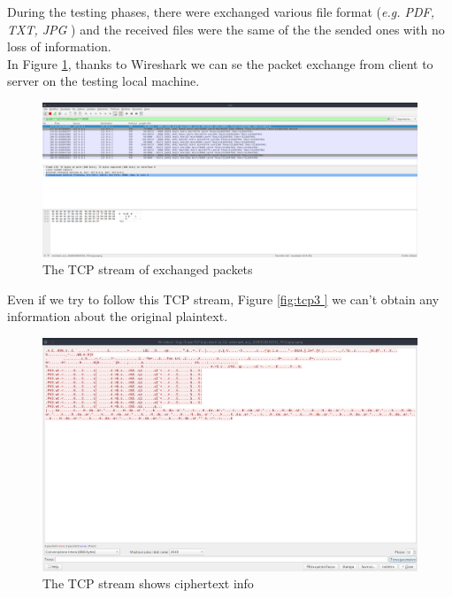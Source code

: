 \documentclass[]{report}
\begin{document}
During the testing phases, there were exchanged various file format (\textit{e.g. PDF, TXT, JPG }) and the received files were the same of the the sended ones with no loss of information.\\
In Figure \ref{fig:tcp2}, thanks to Wireshark we can se the packet exchange from client to server on the testing local machine.



\begin{figure}[!htb]
	\includegraphics[width=\linewidth]{wireshark.png}
	\caption{The TCP stream of exchanged packets}
	\label{fig:tcp2}
\end{figure}



Even if we try to follow this TCP stream, Figure \ref{fig:tcp3 } we can't obtain any information about the original plaintext.

\begin{figure}[!htb]
	\includegraphics[width=\linewidth]{flusso.png}
	\caption{The TCP stream shows ciphertext info}
	\label{fig:tcp3}
\end{figure}
	
	
\end{document}
